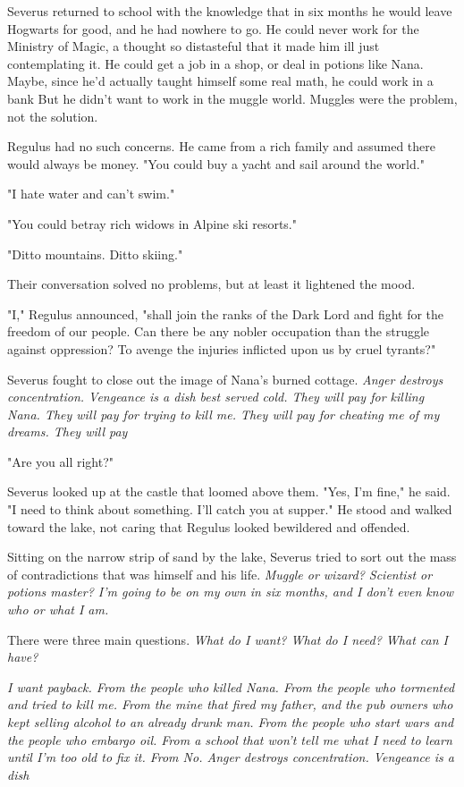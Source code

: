 Severus returned to school with the knowledge that in six months he would leave Hogwarts for good, and he had nowhere to go. He could never work for the Ministry of Magic, a thought so distasteful that it made him ill just contemplating it. He could get a job in a shop, or deal in potions like Nana. Maybe, since he'd actually taught himself some real math, he could work in a bank{\el} But he didn't want to work in the muggle world. Muggles were the problem, not the solution.

Regulus had no such concerns. He came from a rich family and assumed there would always be money. "You could buy a yacht and sail around the world."

"I hate water and can't swim."

"You could betray rich widows in Alpine ski resorts."

"Ditto mountains. Ditto skiing."

Their conversation solved no problems, but at least it lightened the mood.

"I," Regulus announced, "shall join the ranks of the Dark Lord and fight for the freedom of our people. Can there be any nobler occupation than the struggle against oppression? To avenge the injuries inflicted upon us by cruel tyrants?"

Severus fought to close out the image of Nana's burned cottage. \emph{Anger destroys concentration. Vengeance is a dish best served cold. They will pay for killing Nana. They will pay for trying to kill me. They will pay for cheating me of my dreams. They will pay{\el}}

"Are you all right?"

Severus looked up at the castle that loomed above them. "Yes, I'm fine," he said. "I need to think about something. I'll catch you at supper." He stood and walked toward the lake, not caring that Regulus looked bewildered and offended.

Sitting on the narrow strip of sand by the lake, Severus tried to sort out the mass of contradictions that was himself and his life. \emph{Muggle or wizard? Scientist or potions master? I'm going to be on my own in six months, and I don't even know who or what I am.}

There were three main questions. \emph{What do I want? What do I need? What can I have?}

\emph{I want payback. From the people who killed Nana. From the people who tormented and tried to kill me. From the mine that fired my father, and the pub owners who kept selling alcohol to an already drunk man. From the people who start wars and the people who embargo oil. From a school that won't tell me what I need to learn until I'm too old to fix it. From{\el} No. Anger destroys concentration. Vengeance is a dish{\el}}

